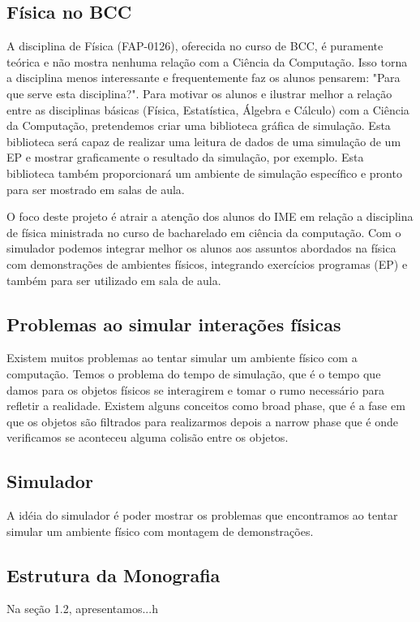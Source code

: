 
\subsection{Física no BCC}

A disciplina de Física (FAP-0126), oferecida no curso de BCC, é puramente teórica e não mostra nenhuma relação com a Ciência da Computação. Isso torna a disciplina menos interessante e frequentemente faz os alunos pensarem: "Para que serve esta disciplina?".
Para motivar os alunos e ilustrar melhor a relação entre as disciplinas básicas (Física, Estatística, Álgebra e Cálculo) com a Ciência da Computação, pretendemos criar uma biblioteca gráfica de simulação. Esta biblioteca será capaz de realizar uma leitura de dados de uma simulação de um EP e mostrar graficamente o resultado da simulação, por exemplo.
Esta biblioteca também proporcionará um ambiente de simulação específico e pronto para ser mostrado em salas de aula.

O foco deste projeto é atrair a atenção dos alunos do IME em relação a disciplina de física ministrada no curso de bacharelado em ciência da computação.
Com o simulador podemos integrar melhor os alunos aos assuntos abordados na física com demonstrações de ambientes físicos, 
integrando exercícios programas (EP) e também para ser utilizado em sala de aula.

\subsection{Problemas ao simular interações físicas}

Existem muitos problemas ao tentar simular um ambiente físico com a computação. Temos o problema do tempo de simulação, 
que é o tempo que damos para os objetos físicos se interagirem e tomar o rumo necessário para refletir a realidade.
Existem alguns conceitos como broad phase, que é a fase em que os objetos são filtrados para realizarmos depois a narrow phase que é onde verificamos se aconteceu 
alguma colisão entre os objetos.

\subsection{Simulador}

A idéia do simulador é poder mostrar os problemas que encontramos ao tentar simular um ambiente físico com montagem de demonstrações. 

\subsection{Estrutura da Monografia}

Na seção 1.2, apresentamos...h
